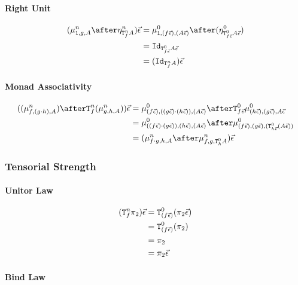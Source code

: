 \documentclass{report}
\newcommand{\Tz}[2]{\texttt{T}^0_{#1}#2}
\newcommand{\Tn}[2]{\texttt{T}^n_{#1}#2}
\newcommand{\pointz}[1]{\point{#1}^0}
\newcommand{\pointn}[1]{\point{#1}^n}
\newcommand{\bindz}[3]{\bind{#1}{#2}{#3}^0}
\newcommand{\bindn}[3]{\bind{#1}{#2}{#3}^n}
\newcommand\ev[0]{\vec{\e}}
\begin{document}
\paragraph{Right Unit}

\begin{align}
    (\bindn{\1}{g}{A}\after\pointn{\Tn{f}{A}})\ev &= \bindz{\1}{(f\ev)}{(A\ev)} \after (\pointz{\Tz{f\ev}{A\ev}})\\
    &= \Id{\Tz{f\ev}{A\ev}}\\
    &=(\Id{\Tn{f}{A}})\ev
\end{align}


\paragraph{Monad Associativity}

\begin{align}
    ((\bindn{f}{(g\dot h)}{A})\after\Tn{f}{(\bindn{g}{h}{A})})\ev &= \bindz{(f\ev)}{((g\ev)\dot(h\ev))}{(A\ev)}\after\Tz{f\ev}{\bindz{(h\ev)}{(g\ev)}{A\ev}}\\
    &= \bindz{((f\ev)\dot(g\ev))}{(h\ev)}{(A\ev)}\after\bindz{(f\ev)}{(g\ev)}{(\Tz{h\ev}{(A\ev)})}\\
    & = (\bindn{f\dot g}{h}{A}\after\bindn{f}{g}{\Tz{h}{A}})\ev
\end{align}
\subsubsection{Tensorial Strength}

\paragraph{Unitor Law}
\begin{align}
    (\Tn{f}{\pp})\ev&= \Tz{(f\ev)}{(\pp\ev)}\\
    & =  \Tz{(f\ev)}{(\pp)}\\
    & = \pp\\
    &= \pp\ev
\end{align}

\paragraph{Bind Law}

\end{document}
